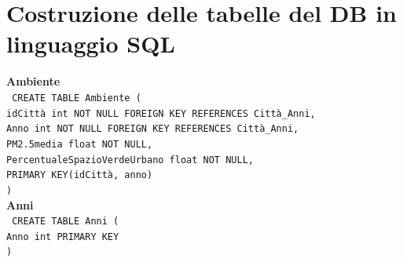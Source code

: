 \documentclass[a4paper,12pt]{report}
\begin{document}
            \section{Costruzione delle tabelle del DB in linguaggio SQL}
                
                \noindent
                {\large \textbf{Ambiente}} \\
                \texttt{
                    CREATE TABLE Ambiente ( \\
                    \null\quad\quad idCittà int NOT NULL FOREIGN KEY REFERENCES Città\_Anni, \\
                    \null\quad\quad Anno int NOT NULL FOREIGN KEY REFERENCES Città\_Anni, \\
                    \null\quad\quad PM2.5media                      float           NOT NULL, \\
                    \null\quad\quad PercentualeSpazioVerdeUrbano    float           NOT NULL, \\
                    \null\quad\quad PRIMARY KEY(idCittà, anno) \\
                    )
                } \\

                \noindent
                {\large \textbf{Anni}} \\
                \texttt{
                    CREATE TABLE Anni ( \\
                    \null\quad\quad Anno    int     PRIMARY KEY \\
                    )
                } \\
\end{document}
